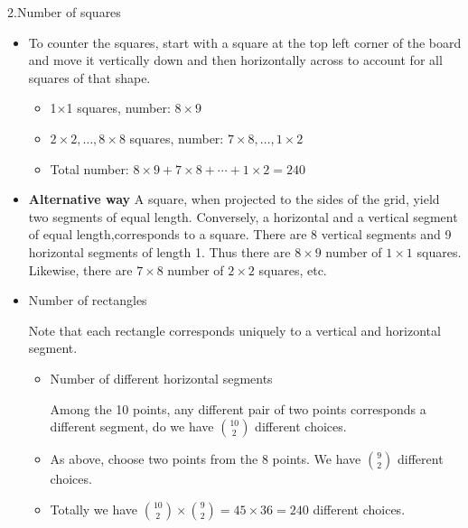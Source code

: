 \documentclass{beamer}
\begin{document}
\begin{frame}{2.Number of squares}
  \begin{itemize}
    \item To counter the squares, start with a square at the top left corner of the board and move it vertically down
          and then horizontally across to account for all squares of that shape.
          \framebreak
          \begin{itemize}
            \item 1$\times$1 squares, number: $8\times 9$ 
            \item $2\times 2,\ldots, 8\times 8$ squares, number: $7\times 8,\ldots, 1\times 2$
            \item Total number:  $8\times 9+7\times 8+\cdots +1\times 2=240$
          \end{itemize}
    \item \textbf{Alternative way} A square, when projected to the sides of the grid, yield two segments of
          equal length. Conversely, a horizontal and a vertical segment of equal length,corresponds
          to a square. There are 8 vertical segments and 9 horizontal segments of length 1. Thus
          there are $8\times 9$ number of $1\times 1$ squares. Likewise, there are $7\times 8$ number of $2\times 2$ squares, etc.
    \item Number of rectangles

          Note that each rectangle corresponds uniquely to a  vertical and horizontal segment.
          \begin{itemize}
            \item Number of different horizontal segments

                  Among the 10 points, any different pair of two points corresponds a different segment, do we have
                  $\binom{10}{2}$ different choices.
            \item As above, choose two points from the 8 points. We have $\binom{9}{2}$ different choices.
            \item Totally we have $\binom{10}{2}\times \binom{9}{2}=45\times 36=240$ different choices.
          \end{itemize}

  \end{itemize}
\end{frame}
\end{document}
